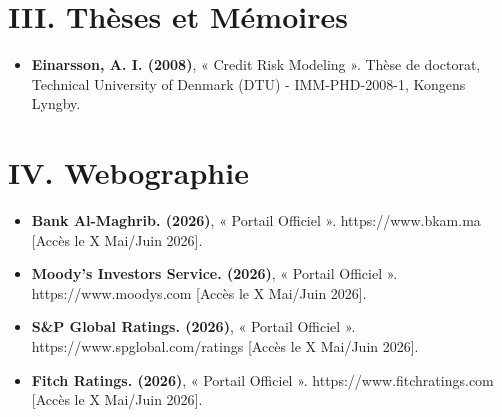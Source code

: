\section*{III. Thèses et Mémoires}
\begin{itemize}
    \item \textbf{Einarsson, A. I. (2008)}, « Credit Risk Modeling ». Thèse de doctorat, Technical University of Denmark (DTU) - IMM-PHD-2008-1, Kongens Lyngby.
\end{itemize}

\section*{IV. Webographie}
\begin{itemize}
    \item \textbf{Bank Al-Maghrib. (2026)}, « Portail Officiel ». https://www.bkam.ma [Accès le X Mai/Juin 2026].
    \item \textbf{Moody's Investors Service. (2026)}, « Portail Officiel ». https://www.moodys.com [Accès le X Mai/Juin 2026].
    \item \textbf{S\&P Global Ratings. (2026)}, « Portail Officiel ». https://www.spglobal.com/ratings [Accès le X Mai/Juin 2026].
    \item \textbf{Fitch Ratings. (2026)}, « Portail Officiel ». https://www.fitchratings.com [Accès le X Mai/Juin 2026].
\end{itemize}